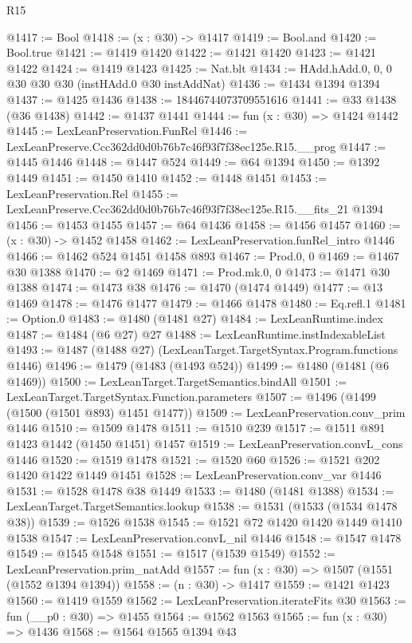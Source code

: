 \begin{lexlean}{R15}
\begin{coremodule}
@1417 := Bool
@1418 := (x : @30) -> @1417
@1419 := Bool.and
@1420 := Bool.true
@1421 := @1419 @1420
@1422 := @1421 @1420
@1423 := @1421 @1422
@1424 := @1419 @1423
@1425 := Nat.blt
@1434 := HAdd.hAdd.{0, 0, 0} @30 @30 @30 (instHAdd.{0} @30 instAddNat)
@1436 := @1434 @1394 @1394
@1437 := @1425 @1436
@1438 := 18446744073709551616
@1441 := @33 @1438 (@36 @1438)
@1442 := @1437 @1441
@1444 := fun (x : @30) => @1424 @1442
@1445 := LexLeanPreservation.FunRel
@1446 := LexLeanPreserve.Ccc362dd0d0b76b7c46f93f7f38ec125e.R15.__prog
@1447 := @1445 @1446
@1448 := @1447 @524
@1449 := @64 @1394
@1450 := @1392 @1449
@1451 := @1450 @1410
@1452 := @1448 @1451
@1453 := LexLeanPreservation.Rel
@1455 := LexLeanPreserve.Ccc362dd0d0b76b7c46f93f7f38ec125e.R15.__fits_21 @1394
@1456 := @1453 @1455
@1457 := @64 @1436
@1458 := @1456 @1457
@1460 := (x : @30) -> @1452 @1458
@1462 := LexLeanPreservation.funRel_intro @1446
@1466 := @1462 @524 @1451 @1458 @893
@1467 := Prod.{0, 0}
@1469 := @1467 @30 @1388
@1470 := @2 @1469
@1471 := Prod.mk.{0, 0}
@1473 := @1471 @30 @1388
@1474 := @1473 @38
@1476 := @1470 (@1474 @1449)
@1477 := @13 @1469
@1478 := @1476 @1477
@1479 := @1466 @1478
@1480 := Eq.refl.{1}
@1481 := Option.{0}
@1483 := @1480 (@1481 @27)
@1484 := LexLeanRuntime.index
@1487 := @1484 (@6 @27) @27
@1488 := LexLeanRuntime.instIndexableList
@1493 := @1487 (@1488 @27) (LexLeanTarget.TargetSyntax.Program.functions @1446)
@1496 := @1479 (@1483 (@1493 @524))
@1499 := @1480 (@1481 (@6 @1469))
@1500 := LexLeanTarget.TargetSemantics.bindAll
@1501 := LexLeanTarget.TargetSyntax.Function.parameters
@1507 := @1496 (@1499 (@1500 (@1501 @893) @1451 @1477))
@1509 := LexLeanPreservation.conv_prim @1446
@1510 := @1509 @1478
@1511 := @1510 @239
@1517 := @1511 @891 @1423 @1442 (@1450 @1451) @1457
@1519 := LexLeanPreservation.convL_cons @1446
@1520 := @1519 @1478
@1521 := @1520 @60
@1526 := @1521 @202 @1420 @1422 @1449 @1451
@1528 := LexLeanPreservation.conv_var @1446
@1531 := @1528 @1478 @38 @1449
@1533 := @1480 (@1481 @1388)
@1534 := LexLeanTarget.TargetSemantics.lookup
@1538 := @1531 (@1533 (@1534 @1478 @38))
@1539 := @1526 @1538
@1545 := @1521 @72 @1420 @1420 @1449 @1410 @1538
@1547 := LexLeanPreservation.convL_nil @1446
@1548 := @1547 @1478
@1549 := @1545 @1548
@1551 := @1517 (@1539 @1549)
@1552 := LexLeanPreservation.prim_natAdd
@1557 := fun (x : @30) => @1507 (@1551 (@1552 @1394 @1394))
@1558 := (n : @30) -> @1417
@1559 := @1421 @1423
@1560 := @1419 @1559
@1562 := LexLeanPreservation.iterateFits @30
@1563 := fun (__p0 : @30) => @1455
@1564 := @1562 @1563
@1565 := fun (x : @30) => @1436
@1568 := @1564 @1565 @1394 @43

\end{coremodule}
\end{lexlean}
